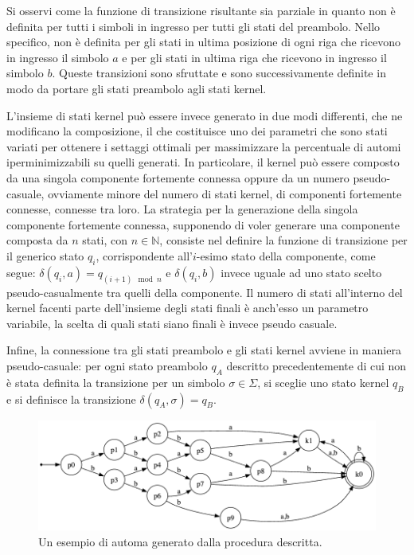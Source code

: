 \documentclass[a4paper,12pt]{report} %
\begin{document}
Si osservi come la funzione di transizione risultante sia parziale in quanto non è definita per tutti i simboli in ingresso
per tutti gli stati del preambolo. Nello specifico, non è definita per gli stati in ultima posizione
di ogni riga che ricevono in ingresso il simbolo $a$ e per gli stati in ultima riga che ricevono in 
ingresso il simbolo $b$. Queste transizioni sono sfruttate e sono successivamente definite in modo da 
portare gli stati preambolo agli stati kernel.

L'insieme di stati kernel può essere invece generato in due modi differenti, che ne modificano la composizione,
il che costituisce uno dei parametri che sono stati variati per ottenere i settaggi ottimali per massimizzare
la percentuale di automi iperminimizzabili su quelli generati. In particolare, il kernel può essere composto da
una singola componente fortemente connessa oppure da un numero pseudo-casuale, ovviamente minore del numero
di stati kernel, di componenti fortemente connesse, connesse tra loro.
La strategia per la generazione della singola componente fortemente connessa, supponendo di voler generare una
componente composta da $n$ stati, con $n \in \mathbb{N}$, consiste nel definire la 
funzione di transizione per il generico stato $q_i$, corrispondente all'$i$-esimo stato della componente, come
segue: $\delta(q_i, a) = q_{(i+1) \!\! \mod n}$ e $\delta(q_i, b)$ invece uguale ad uno stato scelto 
pseudo-casualmente tra quelli della componente. Il numero di stati all'interno del kernel facenti parte dell'insieme degli
stati finali è anch'esso un parametro variabile, la scelta di quali stati siano finali è invece pseudo casuale.

Infine, la connessione tra gli stati preambolo e gli stati kernel avviene in maniera pseudo-casuale: per ogni
stato preambolo $q_A$ descritto precedentemente di cui non è stata definita la transizione per un simbolo
$\sigma \in \Sigma$, si sceglie uno stato kernel $q_B$ e si definisce la transizione $\delta(q_A, \sigma) = q_B$.

\begin{figure}[!htb]
  \centering
  \includegraphics[width=0.8\linewidth]{images/gen_dfa.png}
  \caption{\label{fig:gen-dfa}Un esempio di automa generato dalla procedura descritta.}
\end{figure}
\end{document}
